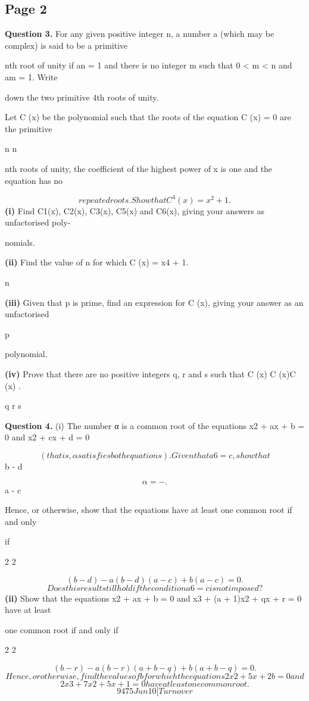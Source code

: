 \documentclass[12pt]{article}
\begin{document}
\subsection*{Page 2}
\begin{flushleft}
\bigskip\textbf{Question 3.} For any given positive integer n, a number a (which may be complex) is said to be a primitive\par
nth root of unity if an = 1 and there is no integer m such that 0 < m < n and am = 1. Write\par
down the two primitive 4th roots of unity.\par
Let C (x) be the polynomial such that the roots of the equation C (x) = 0 are the primitive\par
n n\par
nth roots of unity, the coefficient of the highest power of x is one and the equation has no\par
\[repeated roots. Show that C^4(x) = x^2 + 1 .\]
\textbf{(i)} Find C1(x), C2(x), C3(x), C5(x) and C6(x), giving your answers as unfactorised poly-\par
nomials.\par
\textbf{(ii)} Find the value of n for which C (x) = x4 + 1.\par
n\par
\textbf{(iii)} Given that p is prime, find an expression for C (x), giving your answer as an unfactorised\par
p\par
polynomial.\par
\textbf{(iv)} Prove that there are no positive integers q, r and s such that C (x) \equiv C (x)C (x) .\par
q r s\par
\bigskip\textbf{Question 4.} (i) The number α is a common root of the equations x2 + ax + b = 0 and x2 + cx + d = 0\par
\[(that is, α satisfies both equations). Given that a 6= c, show that\]
b - d\par
\[α = - .\]
a - c\par
Hence, or otherwise, show that the equations have at least one common root if and only\par
if\par
2 2\par
\[(b - d) - a(b - d)(a - c) + b(a - c) = 0 .\]
\[Does this result still hold if the condition a 6= c is not imposed?\]
\textbf{(ii)} Show that the equations x2 + ax + b = 0 and x3 + (a + 1)x2 + qx + r = 0 have at least\par
one common root if and only if\par
2 2\par
\[(b - r) - a(b - r)(a + b - q) + b(a + b - q) = 0 .\]
\[Hence, or otherwise, find the values of b for which the equations 2x2 + 5x + 2b = 0 and\]
\[2x3 + 7x2 + 5x + 1 = 0 have at least one common root.\]
\[9475 Jun10 [Turn over\]
\end{flushleft}
\end{document}
